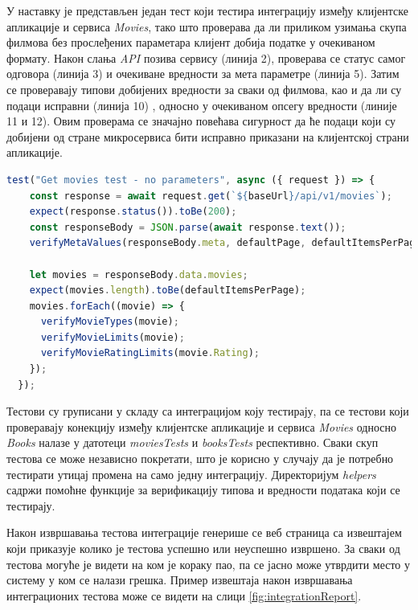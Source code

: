 \documentclass[12pt,oneside]{memoir}
\begin{document}
У наставку је представљен један тест који тестира интеграцију између клијентске апликације и сервиса \textit{Movies}, тако што проверава да ли приликом узимања скупа филмова без прослеђених параметара клијент добија податке у очекиваном формату. Након слања \textit{API} позива сервису (линија 2), проверава се статус самог одговора (линија 3) и очекиване вредности за мета параметре (линија 5). Затим се проверавају типови добијених вредности за сваки од филмова, као и да ли су подаци исправни  (линија 10) , односно у очекиваном опсегу вредности (линије 11 и 12). Овим проверама се значајно повећава сигурност да ће подаци који су добијени од стране микросервиса бити исправно приказани на клијентској страни апликације.

\begin{lstlisting}[caption= Тест интеграције сервиса \textit{Movies} и клијентске апликације, 
language=Javascript,
label={lst:integrationTest},
frame=single]
test("Get movies test - no parameters", async ({ request }) => {
    const response = await request.get(`${baseUrl}/api/v1/movies`);
    expect(response.status()).toBe(200);
    const responseBody = JSON.parse(await response.text());
    verifyMetaValues(responseBody.meta, defaultPage, defaultItemsPerPage);

    let movies = responseBody.data.movies;
    expect(movies.length).toBe(defaultItemsPerPage);
    movies.forEach((movie) => {
      verifyMovieTypes(movie);
      verifyMovieLimits(movie);
      verifyMovieRatingLimits(movie.Rating);
    });
  });
\end{lstlisting}

Тестови су груписани у складу са интеграцијом коју тестирају, па се тестови који проверавају конекцију између клијентске апликације и сервиса \textit{Movies} односно \textit{Books} налазе у датотеци \textit{moviesTests} и \textit{booksTests} респективно. Сваки скуп тестова се може независно покретати, што је корисно у случају да је потребно тестирати утицај промена на само једну интеграцију. Директоријум \textit{helpers} садржи помоћне функције за верификацију типова и вредности података који се тестирају.

Након извршавања тестова интеграције генерише се веб страница са извештајем који приказује колико је тестова успешно или неуспешно извршено. За сваки од тестова могуће је видети на ком је кораку пао, па се јасно може утврдити место у систему у ком се налази грешка. Пример извештаја након извршавања интеграционих тестова може се видети на слици \ref{fig:integrationReport}.
\end{document}
